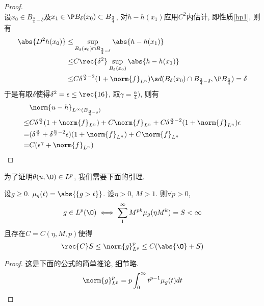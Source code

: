 \begin{proof}
\begin{equation}
    \end{equation}
    设$x_0 \in B_{\frac{3 }{4}-\delta}$及$x_1 \in \P B_\delta(x_0) \subset B_\frac{3}{4}$, 对$h-h(x_1)$应用$C^2$内估计, 即性质\eqref{hp1}, 则有
    \begin{equation}
        \begin{split}
            \abs{D^2h(x_0)} \le & \sup_{B_\delta(x_0)\cap B_{\frac{3}{4}-\delta}}\abs{h-h(x_1)} \\
            \le & C\rec{\delta^2} \sup_{B_\delta(x_0)}\abs{h-h(x_1)} \\
            \le &C\delta^{\frac{\alpha}{2}-2}(1+\norm{f}_{L^n})  \s d(B_\delta(x_0)\cap B_{\frac{3 }{4}-\delta}, \P B_\frac{3 }{4})=\delta
        \end{split}
    \end{equation}
    于是有取$\delta$使得$\delta^2=\epsilon \le \rec{16}$, 取$\gamma=\frac{\alpha}{4})$, 则有
    \begin{equation}
        \begin{split}
            &\norm{u-h}_{L^\infty(B_{\frac{3 }{4}-\delta})}  \\
            \le & C\delta^\frac{\alpha}{2}(1+\norm{f}_{L^n})+C\norm{f}_{L^n}+C\delta^{\frac{\alpha}{2}-2}(1+\norm{f}_{L^n})\epsilon \\
            = &(\delta^\frac{\alpha}{2}+\delta^{\frac{\alpha}{2}-2}\epsilon)(1+\norm{f}_{L^n})+C\norm{f}_{L^n} \\
            = &C(\epsilon^\gamma+\norm{f}_{L^n})
        \end{split}
    \end{equation}
\end{proof}
为了证明$\theta(u, \O) \in L^p$, 我们需要下面的引理.  
\begin{lemma} \label{lp_integrable}
    设$g \ge 0$.  $\mu_g(t) = \abs{\{g>t\}}$.  设$ \eta >0$, $M>1$.  则$\forall p >0$, 
    \begin{equation}
        g \in L^p(\O) \iff \sum^\infty_1 M^{pk}\mu_g(\eta M^k) =S< \infty
    \end{equation}
    且存在$C=C(\eta, M, p)$使得
    \begin{equation}
        \rec{C}S \le \norm{g}_{L^p}^p \le C(\abs{\O}+S)
    \end{equation}
\end{lemma}
\begin{proof}
    这是下面的公式的简单推论, 细节略.  
    \begin{equation}
        \norm{g}_{L^p}^p =p \int^\infty_0 t^{p-1}\mu_g(t)dt
    \end{equation}
\end{proof}
